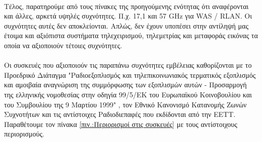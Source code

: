 \documentclass[a4paper, 12pt, twoside]{report}
\begin{document}
{{{{{{			\paragraph{}{Τέλος, παρατηρούμε από τους πίνακες της προηγούμενης ενότητας ότι αναφέρονται και άλλες, αρκετά υψηλές συχνότητες. Π.χ. 17,1 και 57 GHz για WAS / RLAN. Οι συχνότητες αυτές δεν αποκλείονται. Απλώς, δεν έχουν υποπέσει στην αντίληψή μας έτοιμα και αξιόπιστα συστήματα τηλεχειρισμού, τηλεμετρίας και μεταφοράς εικόνας τα οποία να αξιοποιούν τέτοιες συχνότητες.
			}
			}
			\paragraph{}{Οι συσκευές που αξιοποιούν τις παραπάνω συχνότητες  εμβέλειας καθορίζονται με το Προεδρικό Διάταγμα "Ραδιοεξοπλισμός και τηλεπικοινωνιακός τερματικός εξοπλισμός και αμοιβαία αναγνώριση της συμμόρφωσης των εξοπλισμών αυτών - Προσαρμογή της ελληνικής νομοθεσίας στην οδηγία 99/5/ΕΚ του Ευρωπαϊκού Κοινοβουλίου και του Συμβουλίου της 9 Μαρτίου 1999" \cite{ΦΕΚ202Α44}, τον Εθνικό Κανονισμό Κατανομής Ζωνών Συχνοτήτων \cite{ΦΕΚ2006Β399} και τις αντίστοιχες Ραδιοδιεπαφές που εκδίδονται από την ΕΕΤΤ. Παραθέτουμε τον πίνακα \ref{πιν.:Περιορισμοί στις συσκευές} με τους αντίστοιχους περιορισμούς.
			}
			
			\begin{landscape}	
			\setlength\LTleft{0pt}            %
			\setlength\LTright{0pt}           %
	

\end{landscape}}}}}}
\end{document}
